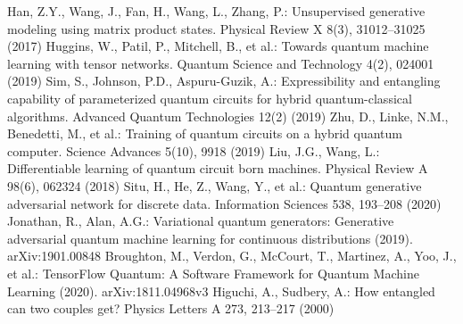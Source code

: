 \documentclass{bmcart}
\begin{document}
\begin{backmatter}
\begin{thebibliography}{99}
 Han, Z.Y., Wang, J., Fan, H., Wang, L., Zhang, P.: Unsupervised generative modeling using matrix product states. Physical Review X 8(3), 31012–31025 (2017) 
 Huggins, W., Patil, P., Mitchell, B., et al.: Towards quantum machine learning with tensor networks. Quantum Science and Technology 4(2), 024001 (2019) 
Sim, S., Johnson, P.D., Aspuru-Guzik, A.: Expressibility and entangling capability of parameterized quantum circuits for hybrid quantum-classical algorithms. Advanced Quantum Technologies 12(2) (2019) 
Zhu, D., Linke, N.M., Benedetti, M., et al.: Training of quantum circuits on a hybrid quantum computer. Science Advances 5(10), 9918 (2019) 
Liu, J.G., Wang, L.: Differentiable learning of quantum circuit born machines. Physical Review A 98(6), 062324 (2018)
 Situ, H., He, Z., Wang, Y., et al.: Quantum generative adversarial network for discrete data. Information Sciences 538, 193–208 (2020) 
 Jonathan, R., Alan, A.G.: Variational quantum generators: Generative adversarial quantum machine learning for continuous distributions (2019). arXiv:1901.00848 
 Broughton, M., Verdon, G., McCourt, T., Martinez, A., Yoo, J., et al.: TensorFlow Quantum: A Software Framework for Quantum Machine Learning (2020). arXiv:1811.04968v3 
 Higuchi, A., Sudbery, A.: How entangled can two couples get? Physics Letters A 273, 213–217 (2000)
\end{thebibliography}




\end{backmatter}
\end{document}
